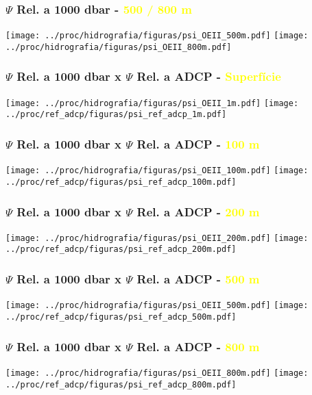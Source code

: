 \documentclass[pdftex]{beamer}
\begin{document}
\frame
{
  \frametitle{$\Psi$ Rel. a 1000 dbar - \textcolor{yellow}{500 / 800 m}}

\begin{center}
\texttt{[image: ../proc/hidrografia/figuras/psi\_OEII\_500m.pdf]}
\texttt{[image: ../proc/hidrografia/figuras/psi\_OEII\_800m.pdf]}
\end{center}
}


\frame
{
  \frametitle{$\Psi$ Rel. a 1000 dbar x $\Psi$ Rel. a ADCP - \textcolor{yellow}{Superfície}}

\begin{center}
\texttt{[image: ../proc/hidrografia/figuras/psi\_OEII\_1m.pdf]}
\texttt{[image: ../proc/ref\_adcp/figuras/psi\_ref\_adcp\_1m.pdf]}
\end{center}
}

\frame
{
  \frametitle{$\Psi$ Rel. a 1000 dbar x $\Psi$ Rel. a ADCP - \textcolor{yellow}{100 m}}

\begin{center}
\texttt{[image: ../proc/hidrografia/figuras/psi\_OEII\_100m.pdf]}
\texttt{[image: ../proc/ref\_adcp/figuras/psi\_ref\_adcp\_100m.pdf]}
\end{center}
}

\frame
{
  \frametitle{$\Psi$ Rel. a 1000 dbar x $\Psi$ Rel. a ADCP - \textcolor{yellow}{200 m}}

\begin{center}
\texttt{[image: ../proc/hidrografia/figuras/psi\_OEII\_200m.pdf]}
\texttt{[image: ../proc/ref\_adcp/figuras/psi\_ref\_adcp\_200m.pdf]}
\end{center}
}

\frame
{
  \frametitle{$\Psi$ Rel. a 1000 dbar x $\Psi$ Rel. a ADCP - \textcolor{yellow}{500 m}}

\begin{center}
\texttt{[image: ../proc/hidrografia/figuras/psi\_OEII\_500m.pdf]}
\texttt{[image: ../proc/ref\_adcp/figuras/psi\_ref\_adcp\_500m.pdf]}
\end{center}
}

\frame
{
  \frametitle{$\Psi$ Rel. a 1000 dbar x $\Psi$ Rel. a ADCP - \textcolor{yellow}{800 m}}

\begin{center}
\texttt{[image: ../proc/hidrografia/figuras/psi\_OEII\_800m.pdf]}
\texttt{[image: ../proc/ref\_adcp/figuras/psi\_ref\_adcp\_800m.pdf]}
\end{center}
}
\end{document}
